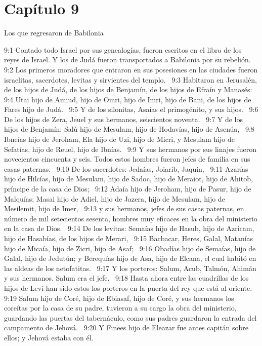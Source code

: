 \section*{Capítulo 9}
Los que regresaron de Babilonia  

9:1 Contado todo Israel por sus genealogías, fueron escritos en el libro de los reyes de Israel. Y los de Judá fueron transportados a Babilonia por su rebelión.  
9:2 Los primeros moradores que entraron en sus posesiones en las ciudades fueron israelitas, sacerdotes, levitas y sirvientes del templo.  
9:3 Habitaron en Jerusalén, de los hijos de Judá, de los hijos de Benjamín, de los hijos de Efraín y Manasés:  
9:4 Utai hijo de Amiud, hijo de Omri, hijo de Imri, hijo de Bani, de los hijos de Fares hijo de Judá.  
9:5 Y de los silonitas, Asaías el primogénito, y sus hijos.  
9:6 De los hijos de Zera, Jeuel y sus hermanos, seiscientos noventa.  
9:7 Y de los hijos de Benjamín: Salú hijo de Mesulam, hijo de Hodavías, hijo de Asenúa,  
9:8 Ibneías hijo de Jeroham, Ela hijo de Uzi, hijo de Micri, y Mesulam hijo de Sefatías, hijo de Reuel, hijo de Ibnías.  
9:9 Y sus hermanos por sus linajes fueron novecientos cincuenta y seis. Todos estos hombres fueron jefes de familia en sus casas paternas.  
9:10 De los sacerdotes: Jedaías, Joiarib, Jaquín,  
9:11 Azarías hijo de Hilcías, hijo de Mesulam, hijo de Sadoc, hijo de Meraiot, hijo de Ahitob, príncipe de la casa de Dios;  
9:12 Adaía hijo de Jeroham, hijo de Pasur, hijo de Malquías; Masai hijo de Adiel, hijo de Jazera, hijo de Mesulam, hijo de Mesilemit, hijo de Imer,  
9:13 y sus hermanos, jefes de sus casas paternas, en número de mil setecientos sesenta, hombres muy eficaces en la obra del ministerio en la casa de Dios.  
9:14 De los levitas: Semaías hijo de Hasub, hijo de Azricam, hijo de Hasabías, de los hijos de Merari,  
9:15 Bacbacar, Heres, Galal, Matanías hijo de Micaía, hijo de Zicri, hijo de Asaf;  
9:16 Obadías hijo de Semaías, hijo de Galal, hijo de Jedutún; y Berequías hijo de Asa, hijo de Elcana, el cual habitó en las aldeas de los netofatitas.  
9:17 Y los porteros: Salum, Acub, Talmón, Ahimán y sus hermanos. Salum era el jefe.  
9:18 Hasta ahora entre las cuadrillas de los hijos de Leví han sido estos los porteros en la puerta del rey que está al oriente.  
9:19 Salum hijo de Coré, hijo de Ebiasaf, hijo de Coré, y sus hermanos los coreítas por la casa de su padre, tuvieron a su cargo la obra del ministerio, guardando las puertas del tabernáculo, como sus padres guardaron la entrada del campamento de Jehová.  
9:20 Y Finees hijo de Eleazar fue antes capitán sobre ellos; y Jehová estaba con él.  
